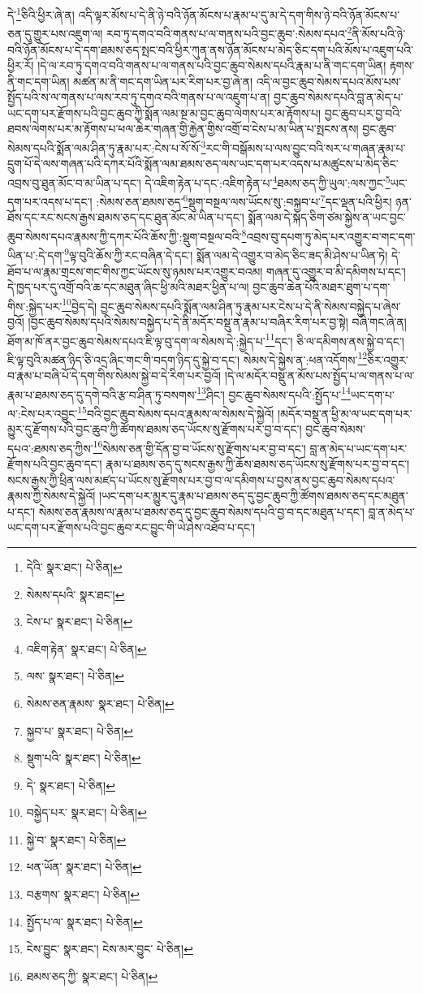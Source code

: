 དེ་\footnote{དེའི་  སྣར་ཐང་།  པེ་ཅིན། }ཅིའི་ཕྱིར་ཞེ་ན། འདི་ལྟར་མོས་པ་དེ་ནི་ཉེ་བའི་ཉོན་མོངས་པ་རྣམ་པ་དུ་མ་དེ་དག་གིས་ཉེ་བའི་ཉོན་མོངས་པ་ཅན་དུ་གྱུར་པས་འཇུག་ལ། རབ་ཏུ་དགའ་བའི་གནས་པ་ལ་གནས་པའི་བྱང་ཆུབ་:སེམས་དཔའ་\footnote{སེམས་དཔའི་  སྣར་ཐང་། }ནི་མོས་པའི་ཉེ་བའི་ཉོན་མོངས་པ་དེ་དག་ཐམས་ཅད་སྤང་བའི་ཕྱིར་ཀུན་ནས་ཉོན་མོངས་པ་མེད་ཅིང་དག་པའི་མོས་པ་འཇུག་པའི་ཕྱིར་རོ། །དེ་ལ་རབ་ཏུ་དགའ་བའི་གནས་པ་ལ་གནས་པའི་བྱང་ཆུབ་སེམས་དཔའི་རྣམ་པ་ནི་གང་དག་ཡིན། རྟགས་ནི་གང་དག་ཡིན། མཚན་མ་ནི་གང་དག་ཡིན་པར་རིག་པར་བྱ་ཞེ་ན། འདི་ལ་བྱང་ཆུབ་སེམས་དཔའ་མོས་པས་སྤྱོད་པའི་ས་ལ་གནས་པ་ལས་རབ་ཏུ་དགའ་བའི་གནས་པ་ལ་འཇུག་པ་ན། བྱང་ཆུབ་སེམས་དཔའི་བླ་ན་མེད་པ་ཡང་དག་པར་རྫོགས་པའི་བྱང་ཆུབ་ཀྱི་སྨོན་ལམ་སྔ་མ་བྱང་ཆུབ་ལེགས་པར་མ་རྟོགས་པ། བྱང་ཆུབ་པར་བྱ་བའི་ཐབས་ལེགས་པར་མ་རྟོགས་པ་ཕལ་ཆེར་གཞན་གྱི་རྐྱེན་གྱིས་འགྲོ་བ་ངེས་པ་མ་ཡིན་པ་སྤངས་ནས། བྱང་ཆུབ་སེམས་དཔའི་སྨོན་ལམ་ཤིན་ཏུ་རྣམ་པར་:ངེས་པ་སོ་སོ་\footnote{ངེས་པ་  སྣར་ཐང་།  པེ་ཅིན། }རང་གི་བསྒོམས་པ་ལས་བྱུང་བའི་སར་པ་གཞན་རྣམ་པ་དྲུག་པོ་དེ་ལས་གཞན་པའི་དཀར་པོའི་སྨོན་ལམ་ཐམས་ཅད་ལས་ཡང་དག་པར་འདས་པ་མཚུངས་པ་མེད་ཅིང་འབྲས་བུ་ཐུན་མོང་བ་མ་ཡིན་པ་དང་། དེ་འཇིག་རྟེན་པ་དང་:འཇིག་རྟེན་པ་\footnote{འཇིག་རྟེན་  སྣར་ཐང་།  པེ་ཅིན། }ཐམས་ཅད་ཀྱི་ཡུལ་:ལས་ཀྱང་\footnote{ལས་  སྣར་ཐང་།  པེ་ཅིན། }ཡང་དག་པར་འདས་པ་དང་། :སེམས་ཅན་ཐམས་ཅད་\footnote{སེམས་ཅན་རྣམས་  སྣར་ཐང་།  པེ་ཅིན། }སྡུག་བསྔལ་ལས་ཡོངས་སུ་:བསྐྱབ་པ་\footnote{སྐྱབ་པ་  སྣར་ཐང་།  པེ་ཅིན། }དང་ལྡན་པའི་ཕྱིར། ཉན་ཐོས་དང་རང་སངས་རྒྱས་ཐམས་ཅད་དང་ཐུན་མོང་མ་ཡིན་པ་དང་། སྨོན་ལམ་དེ་སྐད་ཅིག་ཙམ་སྐྱེས་ན་ཡང་བྱང་ཆུབ་སེམས་དཔའ་རྣམས་ཀྱི་དཀར་པོའི་ཆོས་ཀྱི་:སྡུག་བསྔལ་བའི་\footnote{སྡུག་པའི་  སྣར་ཐང་།  པེ་ཅིན། }འབྲས་བུ་དཔག་ཏུ་མེད་པར་འགྱུར་བ་གང་དག་ཡིན་པ་:དེ་དག་\footnote{དེ་  སྣར་ཐང་།  པེ་ཅིན། }ལྟ་བུའི་ཆོས་ཀྱི་རང་བཞིན་དེ་དང་། སྨོན་ལམ་དེ་འགྱུར་བ་མེད་ཅིང་ཟད་མི་ཤེས་པ་ཡིན་ཏེ། དེ་ཐོབ་པ་ལ་རྣམ་གྲངས་གང་གིས་ཀྱང་ཡོངས་སུ་ཉམས་པར་འགྱུར་བའམ། གཞན་དུ་འགྱུར་བ་མི་དམིགས་པ་དང་། དེ་ཁྱད་པར་དུ་འགྲོ་བའི་ཆ་དང་མཐུན་ཞིང་ཕྱི་མའི་མཐར་ཕྱིན་པ་ལ། བྱང་ཆུབ་ཆེན་པོའི་མཐར་ཐུག་པ་དག་གིས་:སྐྱེད་པར་\footnote{བསྐྱེད་པར་  སྣར་ཐང་།  པེ་ཅིན། }བྱེད་དེ། བྱང་ཆུབ་སེམས་དཔའི་སྨོན་ལམ་ཤིན་ཏུ་རྣམ་པར་ངེས་པ་དེ་ནི་སེམས་བསྐྱེད་པ་ཞེས་བྱའོ། །བྱང་ཆུབ་སེམས་དཔའི་སེམས་བསྐྱེད་པ་དེ་ནི་མདོར་བསྡུ་ན་རྣམ་པ་བཞིར་རིག་པར་བྱ་སྟེ། བཞི་གང་ཞེ་ན། ཐོག་མ་ཁོ་ནར་བྱང་ཆུབ་སེམས་དཔའ་ཇི་ལྟ་བུ་དག་ལ་སེམས་དེ་:སྐྱེད་པ་\footnote{སྐྱེ་བ་  སྣར་ཐང་།  པེ་ཅིན། }དང་། ཅི་ལ་དམིགས་ནས་སྐྱེ་བ་དང་། ཇི་ལྟ་བུའི་མཚན་ཉིད་ཅི་འདྲ་ཞིང་གང་གི་བདག་ཉིད་དུ་སྐྱེ་བ་དང་། སེམས་དེ་སྐྱེས་ན་:ཕན་འདོགས་\footnote{ཕན་ཡོན་  སྣར་ཐང་།  པེ་ཅིན། }ཅིར་འགྱུར་བ་རྣམ་པ་བཞི་པོ་དེ་དག་གིས་སེམས་སྐྱེ་བ་དེ་རིག་པར་བྱའོ། །དེ་ལ་མདོར་བསྡུ་ན་མོས་པས་སྤྱོད་པ་ལ་གནས་པ་ལ་རྣམ་པ་ཐམས་ཅད་དུ་དགེ་བའི་རྩ་བ་ཤིན་ཏུ་བསགས་\footnote{བརྩགས་  སྣར་ཐང་།  པེ་ཅིན། }ཤིང་། བྱང་ཆུབ་སེམས་དཔའི་:སྤྱོད་པ་\footnote{སྤྱོད་པ་ལ་  སྣར་ཐང་།  པེ་ཅིན། }ཡང་དག་པ་ལ་:ངེས་པར་འབྱུང་\footnote{ངེས་བྱུང་  སྣར་ཐང་། ངེས་མར་བྱུང་  པེ་ཅིན། }བའི་བྱང་ཆུབ་སེམས་དཔའ་རྣམས་ལ་སེམས་དེ་སྐྱེའོ། །མདོར་བསྡུ་ན་ཕྱི་མ་ལ་ཡང་དག་པར་མྱུར་དུ་རྫོགས་པའི་བྱང་ཆུབ་ཀྱི་ཚོགས་ཐམས་ཅད་ཡོངས་སུ་རྫོགས་པར་བྱ་བ་དང་། བྱང་ཆུབ་སེམས་དཔའ་:ཐམས་ཅད་ཀྱིས་\footnote{ཐམས་ཅད་ཀྱི་  སྣར་ཐང་།  པེ་ཅིན། }སེམས་ཅན་གྱི་དོན་བྱ་བ་ཡོངས་སུ་རྫོགས་པར་བྱ་བ་དང་། བླ་ན་མེད་པ་ཡང་དག་པར་རྫོགས་པའི་བྱང་ཆུབ་དང་། རྣམ་པ་ཐམས་ཅད་དུ་སངས་རྒྱས་ཀྱི་ཆོས་ཐམས་ཅད་ཡོངས་སུ་རྫོགས་པར་བྱ་བ་དང་། སངས་རྒྱས་ཀྱི་ཕྲིན་ལས་མཛད་པ་ཡོངས་སུ་རྫོགས་པར་བྱ་བ་ལ་དམིགས་པ་བྱས་ནས་བྱང་ཆུབ་སེམས་དཔའ་རྣམས་ཀྱི་སེམས་དེ་སྐྱེའོ། །ཡང་དག་པར་མྱུར་དུ་རྣམ་པ་ཐམས་ཅད་དུ་བྱང་ཆུབ་ཀྱི་ཚོགས་ཐམས་ཅད་དང་མཐུན་པ་དང་། སེམས་ཅན་རྣམས་ལ་རྣམ་པ་ཐམས་ཅད་དུ་བྱང་ཆུབ་སེམས་དཔའི་བྱ་བ་དང་མཐུན་པ་དང་། བླ་ན་མེད་པ་ཡང་དག་པར་རྫོགས་པའི་བྱང་ཆུབ་རང་བྱུང་གི་ཡེ་ཤེས་འཐོབ་པ་དང་། 